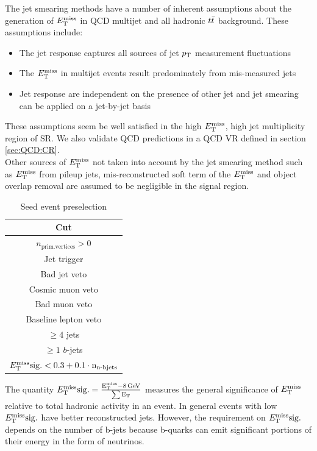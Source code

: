 \indent The jet smearing methods have a number of inherent assumptions about the generation of $E_{\mathrm{T}}^{\mathrm{miss}}$ in QCD multijet and all hadronic $t\bar{t}$ background.  These assumptions include: \\

\begin{itemize}
\item The jet response captures all sources of jet $p_{\mathrm{T}}$ measurement fluctuations
\item The $E_{\mathrm{T}}^{\mathrm{miss}}$ in multijet events result predominately from mis-measured jets
\item Jet response are independent on the presence of other jet and jet smearing can be applied on a jet-by-jet basis
\end{itemize}

\indent These assumptions seem be well satisfied in the high $E_{\mathrm{T}}^{\mathrm{miss}}$, high jet multiplicity region of SR.   We also validate QCD predictions in a QCD VR defined in section \ref{sec:QCD:CR}.\\

\indent Other sources of $E_{\mathrm{T}}^{\mathrm{miss}}$ not taken into account by the jet smearing method such as $E_{\mathrm{T}}^{\mathrm{miss}}$ from pileup jets, mis-reconstructed soft term of the $E_{\mathrm{T}}^{\mathrm{miss}}$ and object overlap removal are assumed to be negligible in the signal region. \\

 \begin{table}[htp]
 \caption{Seed event preselection}
 \begin{center}
 \begin{tabular}{c} \hline
   Cut\\ \hline
   $n_\mathrm{prim. vertices} > 0$\\
   Jet trigger\\
   Bad jet veto\\
   Cosmic muon veto\\
   Bad muon veto\\
   Baseline lepton veto\\
   $\geq 4$ jets\\
   $\geq 1$ $b$-jets\\
   $E_{\mathrm{T}}^{\mathrm{miss}}\rm{sig.} < 0.3 + 0.1\cdot n_{\textup{n-bjets}}$ \\ \hline
 \end{tabular}
 \end{center}
 \label{tb:seed_events_presel}
 \end{table}

\indent The quantity $E_{\mathrm{T}}^{\mathrm{miss}}\rm{sig.}=\frac{ E_{\mathrm{T}}^{\mathrm{miss}}-8\rm{\,GeV} } {\sum E_\mathrm{T} }$ measures the general significance of $E_{\mathrm{T}}^{\mathrm{miss}}$ relative to total hadronic activity in an event.  In general events with low $E_{\mathrm{T}}^{\mathrm{miss}}\rm{sig.}$ have better reconstructed jets.  However, the requirement on $E_{\mathrm{T}}^{\mathrm{miss}}\rm{sig.}$ depends on the number of b-jets because b-quarks can emit significant portions of their energy in the form of neutrinos.  \\

